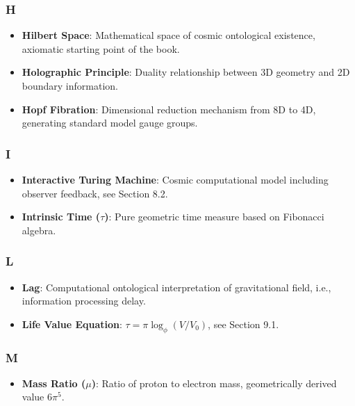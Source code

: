 \subsubsection{H}

\begin{itemize}
\item \textbf{Hilbert Space}: Mathematical space of cosmic ontological existence, axiomatic starting point of the book.
\item \textbf{Holographic Principle}: Duality relationship between 3D geometry and 2D boundary information.
\item \textbf{Hopf Fibration}: Dimensional reduction mechanism from 8D to 4D, generating standard model gauge groups.
\end{itemize}

\subsubsection{I}

\begin{itemize}
\item \textbf{Interactive Turing Machine}: Cosmic computational model including observer feedback, see Section 8.2.
\item \textbf{Intrinsic Time ($\tau$)}: Pure geometric time measure based on Fibonacci algebra.
\end{itemize}

\subsubsection{L}

\begin{itemize}
\item \textbf{Lag}: Computational ontological interpretation of gravitational field, i.e., information processing delay.
\item \textbf{Life Value Equation}: $\tau = \pi \log_\phi (V/V_0)$, see Section 9.1.
\end{itemize}

\subsubsection{M}

\begin{itemize}
\item \textbf{Mass Ratio ($\mu$)}: Ratio of proton to electron mass, geometrically derived value $6\pi^5$.
\end{itemize}

